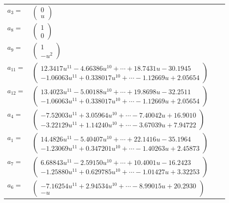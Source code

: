 \documentclass[1p]{elsarticle_modified}
\theoremstyle{definition}
\begin{document}
\begin{tabular}{m{7pt} m{180pt} m{7pt} m{180pt} }
\flushright $a_{3}=$&$\begin{pmatrix}0\\u\end{pmatrix}$ \\
\flushright $a_{8}=$&$\begin{pmatrix}1\\0\end{pmatrix}$ \\
\flushright $a_{9}=$&$\begin{pmatrix}1\\- u^2\end{pmatrix}$ \\
\flushright $a_{11}=$&$\begin{pmatrix}12.3417 u^{11}-4.66386 u^{10}+\cdots+18.7431 u-30.1945\\-1.06063 u^{11}+0.338017 u^{10}+\cdots-1.12669 u+2.05654\end{pmatrix}$ \\
\flushright $a_{12}=$&$\begin{pmatrix}13.4023 u^{11}-5.00188 u^{10}+\cdots+19.8698 u-32.2511\\-1.06063 u^{11}+0.338017 u^{10}+\cdots-1.12669 u+2.05654\end{pmatrix}$ \\
\flushright $a_{4}=$&$\begin{pmatrix}-7.52003 u^{11}+3.05964 u^{10}+\cdots-7.40042 u+16.9010\\-3.22129 u^{11}+1.14240 u^{10}+\cdots-3.67039 u+7.94722\end{pmatrix}$ \\
\flushright $a_{1}=$&$\begin{pmatrix}14.4826 u^{11}-5.40407 u^{10}+\cdots+22.1416 u-35.1964\\-1.23069 u^{11}+0.347201 u^{10}+\cdots-1.40263 u+2.45873\end{pmatrix}$ \\
\flushright $a_{7}=$&$\begin{pmatrix}6.68843 u^{11}-2.59150 u^{10}+\cdots+10.4001 u-16.2423\\-1.25880 u^{11}+0.629785 u^{10}+\cdots-1.01427 u+3.32253\end{pmatrix}$ \\
\flushright $a_{6}=$&$\begin{pmatrix}-7.16254 u^{11}+2.94534 u^{10}+\cdots-8.99015 u+20.2930\\- u\end{pmatrix}$ \\

\end{tabular}
\end{document}
